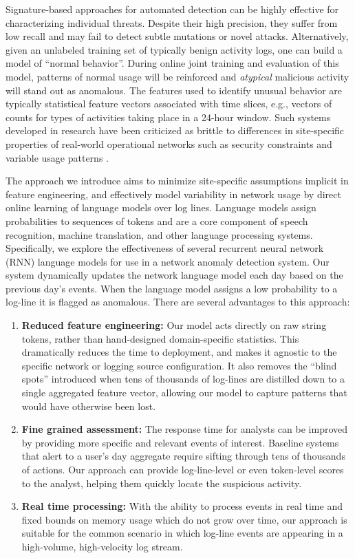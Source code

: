\documentclass[letterpaper]{article} %
\begin{document}
Signature-based approaches for automated detection can be highly effective for characterizing individual threats.   
Despite their high precision, they suffer from low recall and may fail to detect subtle mutations or novel attacks.
Alternatively, given an unlabeled training set of typically benign activity logs, one can build a model of ``normal behavior''. 
During online joint training and evaluation of this model, patterns of normal usage will be reinforced and {\em atypical} malicious activity will stand out as anomalous.
The features used to identify unusual behavior are typically statistical feature vectors associated with time slices,
e.g., vectors of counts for types of activities taking place in a 24-hour window. Such systems developed in research have been criticized as brittle to differences in site-specific properties of real-world operational networks such as security constraints and variable usage patterns \cite{Sommer2010outside}. 

The approach we introduce aims to minimize site-specific assumptions implicit in feature engineering, and effectively model variability in network usage by direct online learning of language models over log lines.  
Language models assign probabilities to sequences of tokens 
and are a core component of speech recognition, machine translation, and other language processing systems. 
Specifically, we explore the effectiveness of several recurrent neural network (RNN) language models for use in a network anomaly detection system. 
Our system dynamically updates the network language model each day based on the previous day's events.
When the language model assigns a low probability to a log-line it is flagged as anomalous.  
There are several advantages to this approach:

\begin{enumerate}
    \item {\bf Reduced feature engineering:} Our model acts directly on raw string tokens, rather than hand-designed domain-specific statistics.  
        This dramatically reduces the time to deployment, and makes it agnostic to the specific network or logging source configuration.  
        It also removes the ``blind spots'' introduced when tens of thousands of log-lines are distilled down to a single aggregated feature vector, 
        allowing our model to capture patterns that would have otherwise been lost.
    \item {\bf Fine grained assessment:} The response time for analysts can be improved by providing more specific and relevant events of interest. Baseline systems that alert to a user's day aggregate require sifting through tens of thousands of actions.
        Our approach can provide log-line-level or even token-level scores to the analyst, helping them quickly locate the suspicious activity.
        \item {\bf Real time processing:}
        With the ability to process events in real time and fixed bounds on memory usage which do not grow over time, our approach is suitable for the common scenario in which log-line events are appearing in a high-volume, high-velocity log stream.
\end{enumerate}
         
\end{document}
